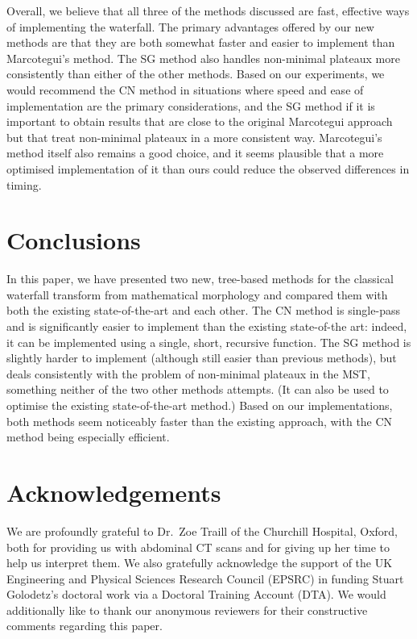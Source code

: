 \documentclass[preprint,a4paper]{elsarticle}
\begin{document}
Overall, we believe that all three of the methods discussed are fast, effective ways of implementing the waterfall. The primary advantages offered by our new methods are that they are both somewhat faster and easier to implement than Marcotegui's method. The SG method also handles non-minimal plateaux more consistently than either of the other methods. Based on our experiments, we would recommend the CN method in situations where speed and ease of implementation are the primary considerations, and the SG method if it is important to obtain results that are close to the original Marcotegui approach but that treat non-minimal plateaux in a more consistent way. Marcotegui's method itself also remains a good choice, and it seems plausible that a more optimised implementation of it than ours could reduce the observed differences in timing.

\section{Conclusions}
\label{sec:conclusions}

In this paper, we have presented two new, tree-based methods for the classical waterfall transform from mathematical morphology and compared them with both the existing state-of-the-art and each other. The CN method is single-pass and is significantly easier to implement than the existing state-of-the art: indeed, it can be implemented using a single, short, recursive function. The SG method is slightly harder to implement (although still easier than previous methods), but deals consistently with the problem of non-minimal plateaux in the MST, something neither of the two other methods attempts. (It can also be used to optimise the existing state-of-the-art method.) Based on our implementations, both methods seem noticeably faster than the existing approach, with the CN method being especially efficient.

\section{Acknowledgements}
\label{sec:acknowledgements}

We are profoundly grateful to Dr.\ Zoe Traill of the Churchill Hospital, Oxford, both for providing us with abdominal CT scans and for giving up her time to help us interpret them. We also gratefully acknowledge the support of the UK Engineering and Physical Sciences Research Council (EPSRC) in funding Stuart Golodetz's doctoral work via a Doctoral Training Account (DTA). We would additionally like to thank our anonymous reviewers for their constructive comments regarding this paper.



\end{document}
